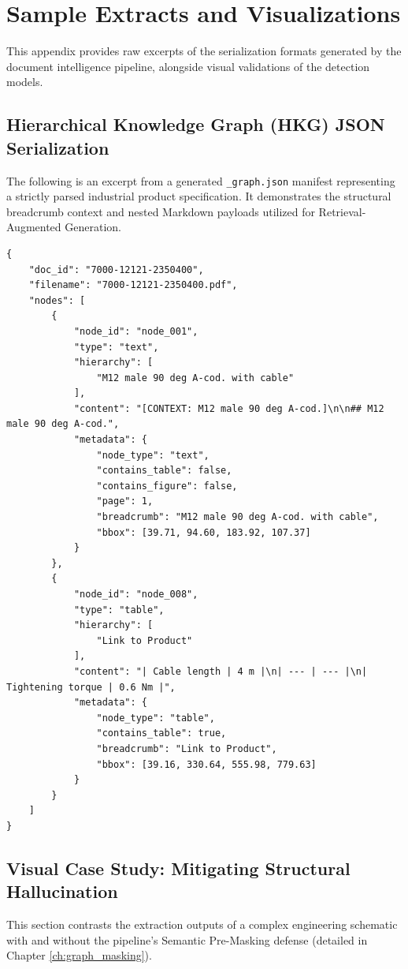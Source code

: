 \chapter{Sample Extracts and Visualizations}
\label{app:sample_outputs}

This appendix provides raw excerpts of the serialization formats generated by the document intelligence pipeline, alongside visual validations of the detection models.

\section{Hierarchical Knowledge Graph (HKG) JSON Serialization}
The following is an excerpt from a generated \texttt{\_graph.json} manifest representing a strictly parsed industrial product specification. It demonstrates the structural breadcrumb context and nested Markdown payloads utilized for Retrieval-Augmented Generation.

\begin{lstlisting}[breaklines=true, basicstyle=\small\ttfamily]
{
    "doc_id": "7000-12121-2350400",
    "filename": "7000-12121-2350400.pdf",
    "nodes": [
        {
            "node_id": "node_001",
            "type": "text",
            "hierarchy": [
                "M12 male 90 deg A-cod. with cable"
            ],
            "content": "[CONTEXT: M12 male 90 deg A-cod.]\n\n## M12 male 90 deg A-cod.",
            "metadata": {
                "node_type": "text",
                "contains_table": false,
                "contains_figure": false,
                "page": 1,
                "breadcrumb": "M12 male 90 deg A-cod. with cable",
                "bbox": [39.71, 94.60, 183.92, 107.37]
            }
        },
        {
            "node_id": "node_008",
            "type": "table",
            "hierarchy": [
                "Link to Product"
            ],
            "content": "| Cable length | 4 m |\n| --- | --- |\n| Tightening torque | 0.6 Nm |",
            "metadata": {
                "node_type": "table",
                "contains_table": true,
                "breadcrumb": "Link to Product",
                "bbox": [39.16, 330.64, 555.98, 779.63]
            }
        }
    ]
}
\end{lstlisting}

\cleardoublepage
\section{Visual Case Study: Mitigating Structural Hallucination}
This section contrasts the extraction outputs of a complex engineering schematic with and without the pipeline's Semantic Pre-Masking defense (detailed in Chapter \ref{ch:graph_masking}).

